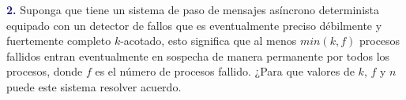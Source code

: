 \textbf{\textcolor{MidnightBlue}{2.}}
Suponga que tiene un sistema de paso de mensajes asíncrono determinista equipado
con un detector de fallos que es eventualmente preciso débilmente y fuertemente
completo $k$-acotado, esto significa que al menos $min(k,f)$ procesos fallidos entran
eventualmente en sospecha de manera permanente por todos los procesos, donde $f$ es
el número de procesos fallido. ¿Para que valores de $k$, $f$ y $n$ puede este sistema
resolver acuerdo.\\
